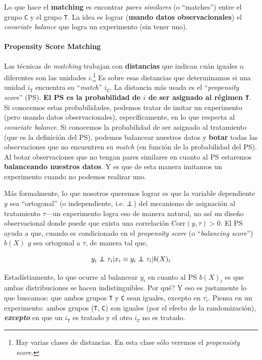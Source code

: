 \documentclass[onesided]{article}\usepackage[]{graphicx}\usepackage[]{color}
\newcommand\independent{\protect\mathpalette{\protect\independenT}{\perp}}
\def\independenT#1#2{\mathrel{\rlap{$#1#2$}\mkern2mu{#1#2}}}
\begin{document}
Lo que hace el {\bf matching} es encontrar \emph{pares similares} (o ``matches'') entre el grupo \texttt{C} y el grupo \texttt{T}. La idea es lograr ({\bf usando datos observacionales}) el \emph{covariate balance} que logra un experimento (sin tener uno). 

\paragraph{Propensity Score Matching} Las t\'ecnicas de \emph{matching} trabajan con {\bf distancias} que indican cu\'an iguales o diferentes son las unidades $i$.\footnote{Hay varias clases de distancias. En esta clase s\'olo veremos el \emph{propensisty score}.} Es sobre esas distancias que determinamos si una unidad $i_{\texttt{T}}$ encuentra su ``\emph{match}'' $i_{\texttt{C}}$. La distancia m\'as usada es el ``\emph{propensity score}'' (PS). {\bf El PS es la probabilidad de $i$ de ser asignado al r\'egimen \texttt{T}}. Si conocemos estas probabilidades, podemos tratar de imitar un experimento (pero usando datos observacionales), espec\'ificamente, en lo que respecta al \emph{covariate balance}. Si conocemos la probabilidad de ser asignado al tratamiento (que es la definici\'on del PS), podemos balancear nuestros datos y {\bf botar} todas las observaciones que no encuentren su \emph{match} (en funci\'on de la probabilidad del PS). Al botar observaciones que no tengan pares similares en cuanto al PS estaremos {\bf balanceando nuestros datos}. Y es que de esta manera imitamos un experimento cuando no podemos realizar uno.


M\'as formalmente, lo que nosotros queremos lograr es que la variable dependiente $y$ sea ``ortogonal'' (o independiente, i.e. $\independent$) del mecanismo de asignaci\'on al tratamiento $\tau$---un experimento logra eso de manera natural, no as\'i un dise\~no observacional donde puede que exista una correlaci\'on $\text{Corr}(y,\tau)>0$. El PS ayuda a que, cuando es condicionado en el \emph{propensity score} (o ``\emph{balancing score}'') $b(X)$ $y$ sea ortogonal a $\tau$, de manera tal que,

\begin{equation}\label{eqMETH:7}
y_{i} \independent \tau_{i} | x_{i} \equiv y_{i} \independent \tau_{i} | b(X)_{i}
\end{equation}

Estad\'istiamente, lo que ocurre al balancear $y_{i}$ en cuanto al PS $b(X)_{i}$ es que ambas distribuciones se hacen indistinguibles. {\color{red}Por qu\'e?} Y eso es justamente lo que buscamos: que ambos grupos \texttt{T} y \texttt{C} sean iguales, excepto en $\tau_{i}$. Piensa en un experimento: ambos grupos (\texttt{T}, \texttt{C}) son iguales (por el efecto de la randomizaci\'on), {\bf \emph{excepto}} en que un $i_{\texttt{T}}$ es tratado y el otro $i_{\texttt{C}}$ no es tratado. 
\end{document}
